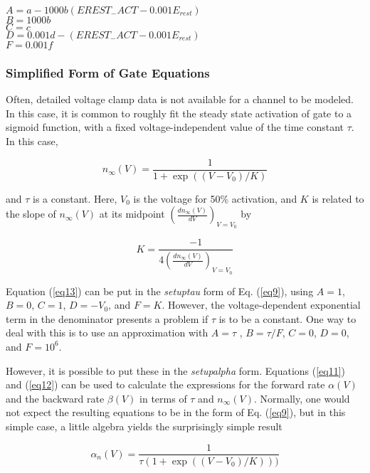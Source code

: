 \documentclass[12pt]{article}
\begin{document}
$A = a - 1000 b (EREST_{-}ACT - 0.001 E_{rest})$ \\
$B = 1000 b$ \\
$C = c$ \\
$D = 0.001 d - (EREST_{-}ACT - 0.001 E_{rest})$ \\
$F = 0.001 f$

\subsubsection{Simplified Form of Gate Equations}

Often, detailed voltage clamp data is not available for a channel to be
modeled.  In this case, it is common to roughly fit the steady state
activation of gate to a sigmoid function, with a fixed
voltage-independent value of the time constant $\tau$.  In this case,

\begin{equation}
n_\infty(V) = \frac{ 1 }{ 1 + \exp((V - V_{0}) / K) }
\label{eq13}
\end{equation}

and $\tau$ is a constant.  Here, $V_{0}$ is the voltage for 50\% activation,
and $K$ is related to the slope of $n_\infty(V)$ at its midpoint 
$(\frac{d n_\infty(V)}{d V})_{V=V_0}$ by

\begin{equation}
K =  \frac{ -1 }{ 4 (\frac{d n_\infty(V)}{d V})_{V=V_0} }
\label{eq14}
\end{equation}

Equation (\ref{eq13}) can be put in the {\em setuptau} form of Eq.
(\ref{eq9}), using $A = 1$, $B = 0$, $C = 1$, $D = -V_0$, and $F = K$.
However, the voltage-dependent exponential term in the denominator
presents a problem if $\tau$ is to be a constant.  One way to deal with
this is to use an approximation with $A = \tau$ , $B = \tau / F$, $C = 0$,
$D = 0$, and $F = 10^6$.

However, it is possible to put these in the {\em setupalpha} form.
Equations (\ref{eq11}) and (\ref{eq12}) can be used to calculate the
expressions for the forward rate $\alpha(V)$ and the backward
rate $\beta(V)$ in terms of $\tau$ and $n_\infty(V)$.  Normally, one would
not expect the resulting equations to be in the form of Eq.  (\ref{eq9}),
but in this simple case, a little algebra yields the surprisingly simple
result

\begin{equation}
\alpha_n(V) = \frac{ 1 }{\tau (1 + \exp((V - V_0) /K)))}
\label{eq15}
\end{equation}
\end{document}
